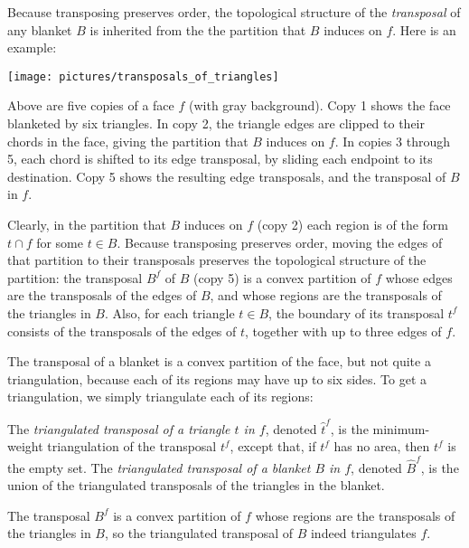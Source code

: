 \documentclass[final]{siamltex}
\newcommand{\transposal}[2]{{#1}^{#2}}
\newcommand{\triangulated}[2]{{\widehat{#1}}^{#2}}
\newcommand{\blanket}{B} \newcommand{\blanketSet}{{\cal B}} \newcommand{\convPart}{\text{\sc cp}}
\newcommand{\face}{f}
\newcommand{\tri}{t}  \newcommand{\vertex}{v}
\begin{document}
Because transposing preserves order, 
the topological structure of the {\em transposal} of any blanket $\blanket$
is inherited from the the partition that $\blanket$ induces on $\face$.
Here is an example:

\noindent\texttt{[image: pictures/transposals\_of\_triangles]}

Above are five copies of a face $\face$ (with gray background).
Copy 1 shows the face blanketed by six triangles.
In copy 2, the triangle edges are clipped to their chords in the face,
giving the partition that $\blanket$ induces on $\face$.
In copies 3 through 5, each chord is shifted to its edge transposal,
by sliding each endpoint to its destination.
Copy 5 shows the resulting edge transposals,
and the transposal of $\blanket$ in $\face$.

Clearly, in the partition that $\blanket$ induces on $\face$ (copy 2)
each region is of the form $\tri\cap\face$ for some $\tri\in\blanket$.
Because transposing preserves order, moving the edges of that partition
to their transposals preserves the topological structure of the partition:
the transposal $\transposal{\blanket}{\face}$ of $\blanket$ (copy 5)
is a convex partition of $\face$
whose edges are the transposals of the edges of $\blanket$,
and whose regions are the transposals of the triangles in $\blanket$.
Also, for each triangle $\tri\in\blanket$,
the boundary of its transposal $\transposal{\tri}{\face}$
consists of the transposals of the edges of $\tri$,
together with up to three edges of $\face$.

The transposal of a blanket is a convex partition of the face,
but not quite a triangulation, because each of its regions may have up to six sides.
To get a triangulation, we simply triangulate each of its regions:

\begin{definition}
The {\em triangulated transposal of a triangle $\tri$ in $\face$},
denoted $\triangulated{\tri}{\face}$,
is the minimum-weight triangulation of the transposal $\transposal{\tri}{\face}$,
except that, if  $\transposal{\tri}{\face}$ has no area, then $\transposal{\tri}{\face}$
is the empty set.
The {\em triangulated transposal of a blanket $\blanket$ in $\face$},
denoted $\triangulated{\blanket}{\face}$,
is the union of the triangulated transposals of the triangles in the blanket.
\end{definition}

The transposal $\transposal{\blanket}{\face}$ is a convex partition of $\face$
whose regions are the transposals of the triangles in $\blanket$,
so the triangulated transposal of $\blanket$ indeed triangulates $\face$.
\end{document}
